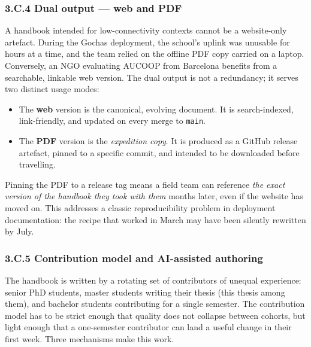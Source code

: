 \hypertarget{c.4-dual-output-web-and-pdf}{%
\subsubsection{3.C.4 Dual output --- web and
PDF}\label{c.4-dual-output-web-and-pdf}}

A handbook intended for low-connectivity contexts cannot be a
website-only artefact. During the Gochas deployment, the school's uplink
was unusable for hours at a time, and the team relied on the offline PDF
copy carried on a laptop. Conversely, an NGO evaluating AUCOOP from
Barcelona benefits from a searchable, linkable web version. The dual
output is not a redundancy; it serves two distinct usage modes:

\begin{itemize}
\tightlist
\item
  The \textbf{web} version is the canonical, evolving document. It is
  search-indexed, link-friendly, and updated on every merge to
  \texttt{main}.
\item
  The \textbf{PDF} version is the \emph{expedition copy}. It is produced
  as a GitHub release artefact, pinned to a specific commit, and
  intended to be downloaded before travelling.
\end{itemize}

Pinning the PDF to a release tag means a field team can reference
\emph{the exact version of the handbook they took with them} months
later, even if the website has moved on. This addresses a classic
reproducibility problem in deployment documentation: the recipe that
worked in March may have been silently rewritten by July.

\hypertarget{c.5-contribution-model-and-ai-assisted-authoring}{%
\subsubsection{3.C.5 Contribution model and AI-assisted
authoring}\label{c.5-contribution-model-and-ai-assisted-authoring}}

The handbook is written by a rotating set of contributors of unequal
experience: senior PhD students, master students writing their thesis
(this thesis among them), and bachelor students contributing for a
single semester. The contribution model has to be strict enough that
quality does not collapse between cohorts, but light enough that a
one-semester contributor can land a useful change in their first week.
Three mechanisms make this work.

